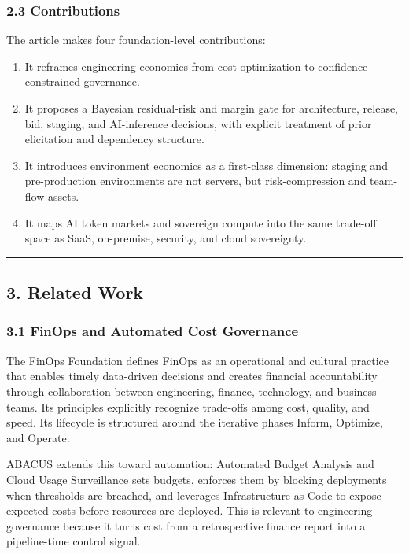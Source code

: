 \documentclass[
]{article}
\providecommand{\tightlist}{%
  \setlength{\itemsep}{0pt}\setlength{\parskip}{0pt}}
\begin{document}
\subsubsection{2.3 Contributions}\label{contributions}

The article makes four foundation-level contributions:

\begin{enumerate}
\def\labelenumi{\arabic{enumi}.}
\tightlist
\item
  It reframes engineering economics from cost optimization to
  confidence-constrained governance.
\item
  It proposes a Bayesian residual-risk and margin gate for architecture,
  release, bid, staging, and AI-inference decisions, with explicit
  treatment of prior elicitation and dependency structure.
\item
  It introduces environment economics as a first-class dimension:
  staging and pre-production environments are not servers, but
  risk-compression and team-flow assets.
\item
  It maps AI token markets and sovereign compute into the same trade-off
  space as SaaS, on-premise, security, and cloud sovereignty.
\end{enumerate}

\begin{center}\rule{0.5\linewidth}{0.5pt}\end{center}

\subsection{3. Related Work}\label{related-work}

\subsubsection{3.1 FinOps and Automated Cost
Governance}\label{finops-and-automated-cost-governance}

The FinOps Foundation defines FinOps as an operational and cultural
practice that enables timely data-driven decisions and creates financial
accountability through collaboration between engineering, finance,
technology, and business teams. Its principles explicitly recognize
trade-offs among cost, quality, and speed. Its lifecycle is structured
around the iterative phases Inform, Optimize, and Operate.

ABACUS extends this toward automation: Automated Budget Analysis and
Cloud Usage Surveillance sets budgets, enforces them by blocking
deployments when thresholds are breached, and leverages
Infrastructure-as-Code to expose expected costs before resources are
deployed. This is relevant to engineering governance because it turns
cost from a retrospective finance report into a pipeline-time control
signal.
\end{document}
